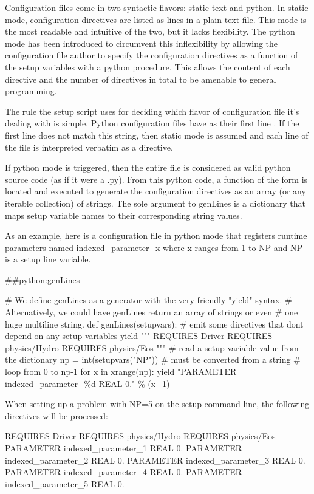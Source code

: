 Configuration files come in two syntactic flavors: static text and python.
In static mode, configuration directives are listed as lines in a plain text
file.  This mode is the most readable and intuitive of the two, but it lacks
flexibility.  The python mode has been introduced to circumvent this
inflexibility by allowing the configuration file author to specify the
configuration directives as a function of the setup variables with a python
procedure.  This allows the content of each directive and the number of
directives in total to be amenable to general programming.

The rule the setup script uses for deciding which flavor of configuration
file it's dealing with is simple.  Python configuration files have as their
first line .  If the first line does not match
this string, then static mode is assumed and each line of the file is
interpreted verbatim as a directive.

If python mode is triggered, then the entire file is considered as valid
python source code (as if it were a .py).  From this python code, a
function of the form  is located and
executed to generate the configuration directives as an array (or any
iterable collection) of strings.  The sole argument to genLines is a
dictionary that maps setup variable names to their corresponding string
values.

As an example, here is a configuration file in python mode that registers
runtime parameters named indexed_parameter_x where x ranges from 1 to NP
and NP is a setup line variable.

\begin{fcodeseg}
##python:genLines

# We define genLines as a generator with the very friendly "yield" syntax.
# Alternatively, we could have genLines return an array of strings or even
# one huge multiline string.
def genLines(setupvars):
    # emit some directives that dont depend on any setup variables
    yield """
REQUIRES Driver
REQUIRES physics/Hydro
REQUIRES physics/Eos
"""
    # read a setup variable value from the dictionary
    np = int(setupvars("NP")) # must be converted from a string
    # loop from 0 to np-1
    for x in xrange(np):
        yield "PARAMETER indexed_parameter_\%d REAL 0." \% (x+1)
\end{fcodeseg}

When setting up a problem with NP=5 on the setup command line, the
following directives will be processed:
\begin{fcodeseg}
REQUIRES Driver
REQUIRES physics/Hydro
REQUIRES physics/Eos
PARAMETER indexed_parameter_1 REAL 0.
PARAMETER indexed_parameter_2 REAL 0.
PARAMETER indexed_parameter_3 REAL 0.
PARAMETER indexed_parameter_4 REAL 0.
PARAMETER indexed_parameter_5 REAL 0.
\end{fcodeseg}

